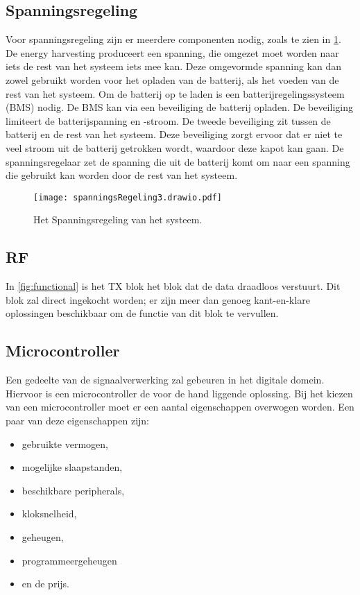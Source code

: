 \subsection{Spanningsregeling}
Voor spanningsregeling zijn er meerdere componenten nodig, zoals te zien in \cref{fig:spanningsregeling}. De energy harvesting produceert een spanning, die omgezet moet worden naar iets de rest van het systeem iets mee kan. Deze omgevormde spanning kan dan zowel gebruikt worden voor het opladen van de batterij, als het voeden van de rest van het systeem.
Om de batterij op te laden is een batterijregelingssysteem (BMS) nodig. De BMS kan via een beveiliging de batterij opladen. De beveiliging limiteert de batterijspanning en -stroom. De tweede beveiliging zit tussen de batterij en de rest van het systeem. Deze beveiliging zorgt ervoor dat er niet te veel stroom uit de batterij getrokken wordt, waardoor deze kapot kan gaan. De spanningsregelaar zet de spanning die uit de batterij komt om naar een spanning die gebruikt kan worden door de rest van het systeem.

\begin{figure}[!htb]
    \centering
    \texttt{[image: spanningsRegeling3.drawio.pdf]}
    \caption{Het Spanningsregeling van het systeem.}
    \label{fig:spanningsregeling}
\end{figure}

\subsection{RF}
In \cref{fig:functional} is het TX blok het blok dat de data draadloos verstuurt. Dit blok zal direct ingekocht worden; er zijn meer dan genoeg kant-en-klare oplossingen beschikbaar om de functie van dit blok te vervullen.


\subsection{Microcontroller}
Een gedeelte van de signaalverwerking zal gebeuren in het digitale domein. Hiervoor is een microcontroller de voor de hand liggende oplossing. Bij het kiezen van een microcontroller moet er een aantal eigenschappen overwogen worden. Een paar van deze eigenschappen zijn:
\begin{itemize}
    \item gebruikte vermogen,
    \item mogelijke slaapstanden,
    \item beschikbare peripherals,
    \item kloksnelheid,
    \item geheugen,
    \item programmeergeheugen
    \item en de prijs.
\end{itemize}
